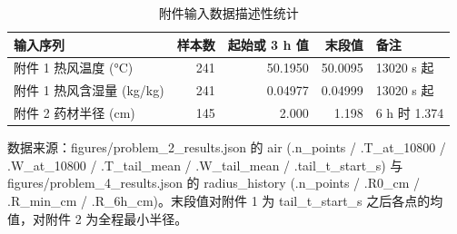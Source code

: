 \begin{table}[H]
  \centering
  \caption{附件输入数据描述性统计}
  \label{tab:input_stats}
  \begin{tabular}{lrrrl}
    \toprule
    输入序列 & 样本数 & 起始或 3 h 值 & 末段值 & 备注 \\
    \midrule
    附件 1 热风温度 (°C) & 241 & 50.1950 & 50.0095 & 13020 s 起 \\
    附件 1 热风含湿量 (kg/kg) & 241 & 0.04977 & 0.04999 & 13020 s 起 \\
    附件 2 药材半径 (cm) & 145 & 2.000 & 1.198 & 6 h 时 1.374 \\
    \bottomrule
  \end{tabular}
  \par\vspace{2pt}\footnotesize 数据来源：figures/problem\_2\_results.json 的 air (.n\_points / .T\_at\_10800 / .W\_at\_10800 / .T\_tail\_mean / .W\_tail\_mean / .tail\_t\_start\_s) 与 figures/problem\_4\_results.json 的 radius\_history (.n\_points / .R0\_cm / .R\_min\_cm / .R\_6h\_cm)。末段值对附件 1 为 tail\_t\_start\_s 之后各点的均值，对附件 2 为全程最小半径。
\end{table}
